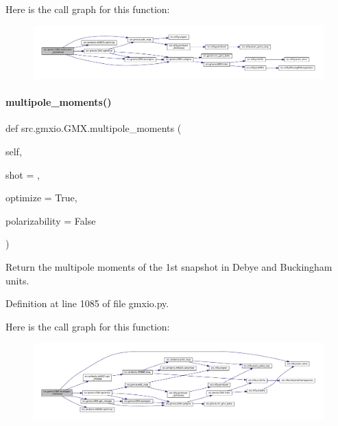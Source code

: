 Here is the call graph for this function\+:
\nopagebreak
\begin{figure}[H]
\begin{center}
\leavevmode
\includegraphics[width=350pt]{classsrc_1_1gmxio_1_1GMX_abab1e48b2b3d25277b9f4392807938ae_cgraph}
\end{center}
\end{figure}
\mbox{\label{classsrc_1_1gmxio_1_1GMX_a28111ac260dc9abee6f9f9e9bfaa8332}} 
\paragraph{\texorpdfstring{multipole\+\_\+moments()}{multipole\_moments()}}
{\footnotesize\ttfamily def src.\+gmxio.\+G\+M\+X.\+multipole\+\_\+moments (\begin{DoxyParamCaption}\item[{}]{self,  }\item[{}]{shot = {},  }\item[{}]{optimize = {\ttfamily True},  }\item[{}]{polarizability = {\ttfamily False} }\end{DoxyParamCaption})}



Return the multipole moments of the 1st snapshot in Debye and Buckingham units. 



Definition at line 1085 of file gmxio.\+py.

Here is the call graph for this function\+:
\nopagebreak
\begin{figure}[H]
\begin{center}
\leavevmode
\includegraphics[width=350pt]{classsrc_1_1gmxio_1_1GMX_a28111ac260dc9abee6f9f9e9bfaa8332_cgraph}
\end{center}
\end{figure}
\mbox{\label{classsrc_1_1gmxio_1_1GMX_a6a18f06050c5b64ef2c88fc8ee40d107}} 
